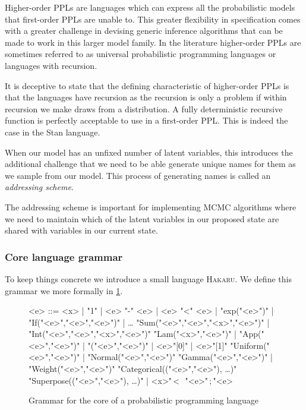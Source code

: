 \documentclass[12pt]{article}
\theoremstyle{definition}
\begin{document}
Higher-order PPLs are languages which can express all the
probabilistic models that first-order PPLs are unable to. This greater
flexibility in specification comes with a greater challenge in
devising generic inference algorithms that can be made to work in this
larger model family. In the literature higher-order PPLs are sometimes
referred to as universal probabilistic programming languages
\citep{infcomp2017, yang2014generating} or languages with recursion.

It is deceptive to state that the defining characteristic of
higher-order PPLs is that the languages have recursion as the
recursion is only a problem if within recursion we make draws from a
distribution. A fully deterministic recursive function is perfectly
acceptable to use in a first-order PPL. This is indeed the case
in the Stan language.

When our model has an unfixed number of latent variables, this introduces
the additional challenge that we need to be able generate unique names
for them as we sample from our model. This process of generating names
is called an \emph{addressing scheme}.

The addressing scheme is important for implementing MCMC algorithms where
we need to maintain which of the latent variables in our proposed state
are shared with variables in our current state.

\subsubsection{Core language grammar}

To keep things concrete we introduce a small language \textsc{Hakaru}.
We define this grammar we more formally in \cref{fig:coregrammar}.

\begin{figure}
\begin{grammar}
  <e> ::= <x> | "1" | <e> "-" <e> | <e> "<" <e> | "exp("<e>")" | "If("<e>","<e>","<e>")" | \dots
\alt "Sum("<e>","<e>","<x>","<e>")" | "Int("<e>","<e>","<x>","<e>")"
\alt "Lam("<x>","<e>")" | "App("<e>","<e>")" | "("<e>","<e>")" | <e>"[0]" | <e>"[1]"
\alt "Uniform("<e>","<e>")" | "Normal("<e>","<e>")"
\alt "Gamma("<e>","<e>")" | "Weight("<e>","<e>")"
\alt "Categorical(("<e>","<e>"), \dots)"
\alt "Superpose(("<e>","<e>"), \dots)" | <x>"\,<~\,"<e>"\,;\,"<e>
\end{grammar}
\caption{Grammar for the core of a probabilistic programming language}
\label{fig:coregrammar}
\end{figure}
\end{document}
